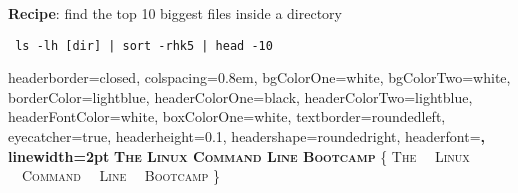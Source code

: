 \documentclass[landscape,a0paper,fontscale=0.285]{baposter} %
\begin{document}
\begin{poster}
{\textbf{Recipe}: find the top 10 biggest files inside a directory

\begin{center}
\texttt{ ls -lh [dir] | sort -rhk5 | head -10}
\end{center}

}
\end{poster}

\newpage


\begin{poster}
{
headerborder=closed, colspacing=0.8em, bgColorOne=white, bgColorTwo=white, borderColor=lightblue, headerColorOne=black, headerColorTwo=lightblue,
headerFontColor=white, boxColorOne=white, textborder=roundedleft, eyecatcher=true, headerheight=0.1\textheight, headershape=roundedright, headerfont=\Large\bf\textsc, linewidth=2pt
}
{\bf\textsc{The Linux Command Line Bootcamp}\vspace{0.5em}} %
{\textsc{\{ The \ \  Linux \ \  Command \ \  Line \ \ Bootcamp \} \hspace{12pt}}}




\end{poster}
\end{document}
